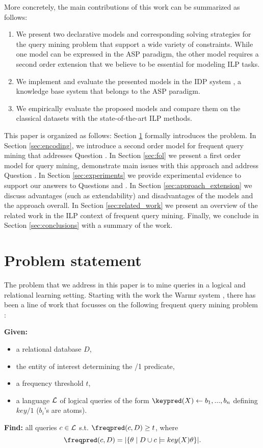 More concretely, the main contributions of this work can be summarized as follows:
\begin{enumerate}
  \item We present two declarative models and corresponding solving strategies for the query mining problem that support a wide variety of constraints.  While one model can be expressed in the ASP paradigm, the other model requires a  second order extension that we believe
to be essential for modeling ILP tasks. 
  \item We implement and evaluate the presented models in the IDP system \parencite{idp}, a knowledge base system that belongs to the ASP paradigm.
  \item We empirically evaluate the proposed models and compare them on the classical datasets with the state-of-the-art ILP methods.
\end{enumerate}


This paper is organized as follows:
Section \ref{sec:problem} formally introduces the problem. In Section \ref{sec:encoding}, we introduce a second order model for frequent query mining that addresses Question \qone. In Section \ref{sec:fol} we present a first order model for query mining, demonstrate main issues with this approach and address Question \qtwo. In Section \ref{sec:experiments} we provide experimental evidence to support our answers to Questions \qtwo and \qthree. In Section \ref{sec:approach_extension} we discuss advantages (such as extendability) and disadvantages of the models and the approach overall. In Section \ref{sec:related_work} we present an overview of the related work in the ILP context of frequent query mining. Finally, we conclude in Section \ref{sec:conclusions} with a summary of the work. 

\section{Problem statement}\label{sec:problem}

The problem that we address in this paper is to mine queries in a logical and relational learning setting. Starting with the work the Warmr system \parencite{warmr}, there has been a line of work that focusses on the following frequent query mining problem \parencite{bagm,farmer,condensed_luc}:


\noindent
{\bf Given:} \vspace{-8pt}
\begin{itemize}
\item a relational database $D$,
\item the entity of interest determining the \keypred/1 predicate,
\item a frequency threshold $t$,
\item a language ${\cal L}$ of logical queries of the form $\keypred(X) \leftarrow b_1, ..., b_n$ defining $key/1$ ($b_i$'s are atoms).
\end{itemize}\vspace{-5pt}
{\bf Find:} all queries $c \in {\cal L}$ s.t. $\freqpred(c,D) \geq t$, where 
\begin{equation*}
\freqpred(c,D) = |\{\theta \mid D \cup c \models key(X)\theta \}|.
\end{equation*}

